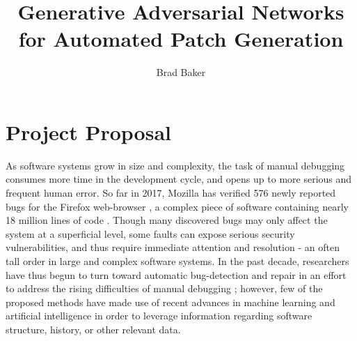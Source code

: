\documentclass{article}
\begin{document}
\title{Generative Adversarial Networks for Automated  Patch Generation}  

\author{Brad Baker}

\maketitle

\section{Project Proposal}

As software systems grow in size and complexity, the task of manual debugging consumes more time in the development cycle, and opens up to more serious and frequent human error. So far in 2017, Mozilla has verified 576 newly reported bugs for the Firefox web-browser \cite{FirefoxBugdays}, a complex piece of software containing nearly 18 million lines of code \cite{FirefoxOpen}. Though many discovered bugs may only affect the system at a superficial level, some faults can expose serious security vulnerabilities, and thus require immediate attention and resolution - an often tall order in large and complex software systems. In the past decade, researchers have thus begun to turn toward automatic bug-detection and repair in an effort to address the rising difficulties of manual debugging \cite{arcuri2008automation}; however, few of the proposed methods have made use of recent advances in machine learning and artificial intelligence in order to leverage information regarding software structure, history, or other relevant data.
\end{document}
